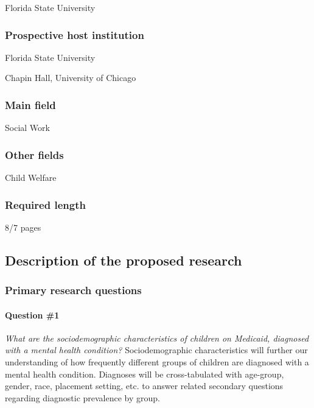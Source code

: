\documentclass[twocolumn, serif, rga, authordate]{jote-article}
\begin{document}
Florida State University


\subsubsection*{Prospective host institution}


Florida State University

\noindent Chapin Hall, University of Chicago


\subsubsection*{Main field}


Social Work


\subsubsection*{Other fields}


Child Welfare


\subsubsection*{Required length}


8/7 pages






\subsection*{Description of the proposed research}



\subsubsection*{Primary research questions}


\paragraph{Question \#1} \emph{What are the sociodemographic
characteristics of children on Medicaid, diagnosed with a mental health
condition?} Sociodemographic characteristics will further our
understanding of how frequently different groups of children are
diagnosed with a mental health condition. Diagnoses will be
cross-tabulated with age-group, gender, race, placement setting, etc. to
answer related secondary questions regarding diagnostic prevalence by
group.
\end{document}
